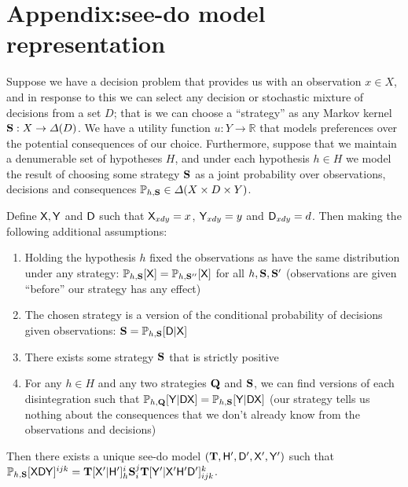
\section{Appendix:see-do model representation}\label{sec:see-do-rep}


\begin{theorem}\label{th:see_do_rep}
Suppose we have a decision problem that provides us with an observation $x\in X$, and in response to this we can select any decision or stochastic mixture of decisions from a set $D$; that is we can choose a ``strategy'' as any Markov kernel $\mathbf{S}:X\to \Delta(D)$. We have a utility function $u:Y\to \mathbb{R}$ that models preferences over the potential consequences of our choice. Furthermore, suppose that we maintain a denumerable set of hypotheses $H$, and under each hypothesis $h\in H$ we model the result of choosing some strategy $\mathbf{S}$ as a joint probability over observations, decisions and consequences $\mathbb{P}_{h,\mathbf{S}}\in \Delta(X\times D\times Y)$.

Define $\mathsf{X},\mathsf{Y}$ and $\mathsf{D}$ such that $\mathsf{X}_{xdy} = x$, $\mathsf{Y}_{xdy}=y$ and $\mathsf{D}_{xdy} = d$. Then making the following additional assumptions:
\begin{enumerate}
    \item Holding the hypothesis $h$ fixed the observations as have the same distribution under any strategy: $\mathbb{P}_{h,\mathbf{S}}[\mathsf{X}]=\mathbb{P}_{h,\mathbf{S}''}[\mathsf{X}]$ for all $h,\mathbf{S},\mathbf{S}'$ (observations are given ``before'' our strategy has any effect)
    \item The chosen strategy is a version of the conditional probability of decisions given observations: $\mathbf{S}=\mathbb{P}_{h,\mathbf{S}}[\mathsf{D}|\mathsf{X}]$
    \item There exists some strategy $\mathbf{S}$ that is strictly positive
    \item For any $h\in H$ and any two strategies $\mathbf{Q}$ and $\mathbf{S}$, we can find versions of each disintegration such that $\mathbb{P}_{h,\mathbf{Q}}[\mathsf{Y}|\mathsf{D}\mathsf{X}]=\mathbb{P}_{h,\mathbf{S}}[\mathsf{Y}|\mathsf{D}\mathsf{X}]$ (our strategy tells us nothing about the consequences that we don't already know from the observations and decisions)
\end{enumerate}

Then there exists a unique see-do model $(\mathbf{T},\mathsf{H}',\mathsf{D}',\mathsf{X}',\mathsf{Y}')$ such that $\mathbb{P}_{h,\mathbf{S}}[\mathsf{XDY}]^{ijk} = \mathbf{T}[\mathsf{X'}|\mathsf{H'}]_{h}^{i} \mathbf{S}_i^j  \mathbf{T}[\mathsf{Y'}|\mathsf{X'H'D'}]_{ijk}^k$.
\end{theorem}

